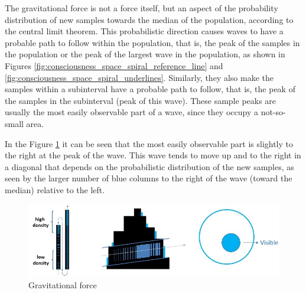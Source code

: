 The gravitational force is not a force itself, but an aspect of the probability distribution of new samples towards the median of the population, according to the central limit theorem.  This probabilistic direction causes waves to have a probable path to follow within the population, that is, the peak of the samples in the population or the peak of the largest wave in the population, as shown in Figures \ref{fig:consciousness_space_spiral_reference_line} and \ref{fig:consciousness_space_spiral_underlines}. Similarly, they also make the samples within a subinterval have a probable path to follow, that is, the peak of the samples in the subinterval (peak of this wave).  These sample peaks are usually the most easily observable part of a wave, since they occupy a not-so-small area.

In the Figure \ref{fig:consciousness_gravitational_force} it can be seen that the most easily observable part is slightly to the right at the peak of the wave. This wave tends to move up and to the right in a diagonal that depends on the probabilistic distribution of the new samples, as seen by the larger number of blue columns to the right of the wave (toward the median) relative to the left.
	\begin{figure}[H]
	\caption{Gravitational force}
	\label{fig:consciousness_gravitational_force}
	\centering
	\includegraphics[scale=.7]{sections/images/consciousness_gravitational_force.jpg}
	\end{figure}

